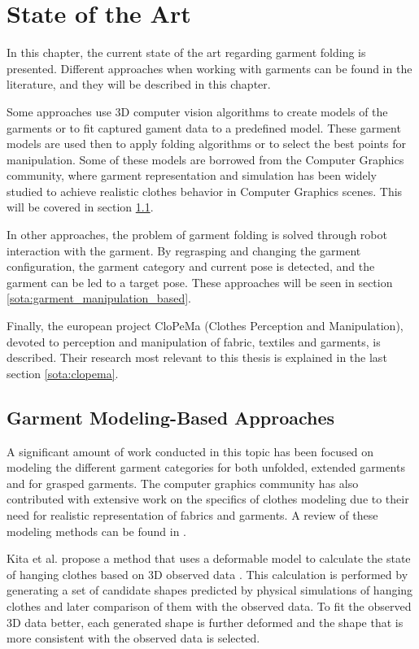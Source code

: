 \chapter{State of the Art}
\label{state_of_the_art}

In this chapter, the current state of the art regarding garment folding is presented. Different approaches when working with garments can be found in the literature, and they will be described in this chapter.

Some approaches use 3D computer vision algorithms to create models of the garments or to fit captured gament data to a predefined model. These garment models are used then to apply folding algorithms or to select the best points for manipulation. Some of these models are borrowed from the Computer Graphics community, where garment representation and simulation has been widely studied to achieve realistic clothes behavior in Computer Graphics scenes. This will be covered in section \ref{sota:garment_model_based}.

In other approaches, the problem of garment folding is solved through robot interaction with the garment. By regrasping and changing the garment configuration, the garment category and current pose is detected, and the garment can be led to a target pose. These approaches will be seen in section \ref{sota:garment_manipulation_based}.

Finally, the european project CloPeMa (Clothes Perception and Manipulation), devoted to perception and manipulation of fabric, textiles and garments, is described. Their research most relevant to this thesis is explained in the last section \ref{sota:clopema}.

\section{Garment Modeling-Based Approaches}
\label{sota:garment_model_based}

A significant amount of work conducted in this topic has been focused on modeling the different garment categories for both unfolded, extended garments and for grasped garments. The computer graphics community has also contributed with extensive work on the specifics of clothes modeling due to their need for realistic representation of fabrics and garments. A review of these modeling methods can be found in \cite{Chen2009}. 

Kita et al. propose a method that uses a deformable model to calculate the state of hanging clothes based on 3D observed data \cite{Kita2004, Kita2009}. This calculation is performed by generating a set of candidate shapes predicted by physical simulations of hanging clothes and later comparison of them with the observed data. To fit the observed 3D data better, each generated shape is further deformed and the shape that is more consistent with the observed data is selected. 

